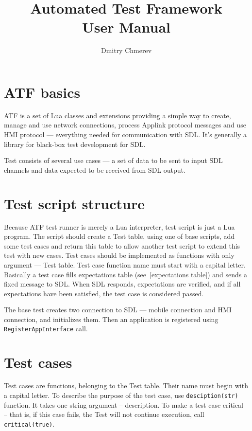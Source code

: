 \documentclass{article}
\title{Automated Test Framework \\ \vspace{2mm} \large User Manual}
\author{Dmitry Chmerev}
\begin{document}
\begin{titlepage}
\maketitle
\end{titlepage}

\tableofcontents
\clearpage

\section{ATF basics}
ATF is a set of Lua classes and extensions providing a simple way to create,
manage and use network connections, process Applink protocol messages
and use HMI protocol --- everything needed for communication with SDL.
It's generally a library for black-box test development for SDL.

Test consists of several use cases --- a set of data to be sent to input
SDL channels and data expected to be received from SDL output.

\section{Test script structure}
Because ATF test runner is merely a Lua interpreter, test script is just
a Lua program.
The script should create a Test table, using one of base scripts,
add some test cases and return this table to allow another test script
to extend this test with new cases.
Test cases should be implemented as functions with only argument --- Test
table.
Test case function name must start with a capital letter.
Basically a test case fills expectations table (see~\ref{expectations table})
and sends a fixed message to SDL.
When SDL responds, expectations are verified, and if all expectations have
been satisfied, the test case is considered passed.

The base test creates two connection to SDL --- mobile connection and HMI
connection, and initializes them.
Then an application is registered using {\tt RegisterAppInterface} call.

\section{Test cases}
Test cases are functions, belonging to the Test table. Their name must begin
with a capital letter. To describe the purpose of the test case, use
{\tt desciption(str)} function. It takes one string argument -- description.
To make a test case critical -- that is, if this case fails, the Test will
not continue execution, call {\tt critical(true)}.
\end{document}
